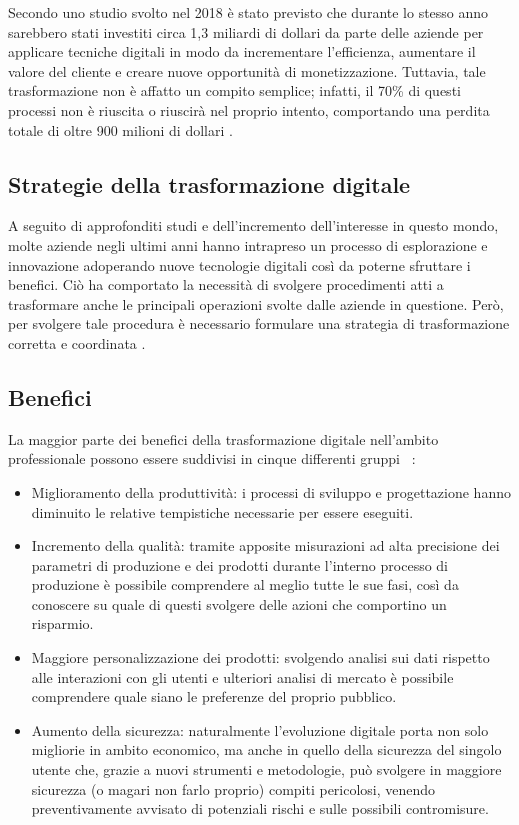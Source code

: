 Secondo uno studio svolto nel 2018 è stato previsto che durante lo stesso anno sarebbero stati investiti circa 1,3 miliardi di dollari da parte delle aziende per applicare tecniche digitali in modo da incrementare l'efficienza, aumentare il valore del cliente e creare nuove opportunità di monetizzazione. Tuttavia, tale trasformazione non è affatto un compito semplice; infatti, il 70\% di questi processi non è riuscita o riuscirà nel proprio intento, comportando  una perdita totale di oltre 900 milioni di dollari \cite{forbes_digital_transformation_fail}.

\subsection{Strategie della trasformazione digitale}

A seguito di approfonditi studi e dell'incremento dell'interesse in questo mondo, molte aziende negli ultimi anni hanno intrapreso un processo di esplorazione e innovazione adoperando nuove tecnologie digitali così da poterne sfruttare i benefici. Ciò ha comportato la necessità di svolgere procedimenti atti a trasformare anche le principali operazioni svolte dalle aziende in questione. Però, per svolgere tale procedura è necessario formulare una strategia di trasformazione corretta e coordinata \cite{digital_transformation_strategies}.

\subsection{Benefici}

La maggior parte dei benefici della trasformazione digitale nell'ambito professionale possono essere suddivisi in cinque differenti gruppi ~\cite{sciencedirect_digital_transformation_benefits}:
\begin{itemize}
    \item Miglioramento della produttività: i processi di sviluppo e progettazione hanno diminuito le relative tempistiche necessarie per essere eseguiti.
    \item Incremento della qualità: tramite apposite misurazioni ad alta precisione dei parametri di produzione e dei prodotti durante l'interno processo di produzione è possibile comprendere al meglio tutte le sue fasi, così da conoscere su quale di questi svolgere delle azioni che comportino un risparmio.
    \item Maggiore personalizzazione dei prodotti: svolgendo analisi sui dati rispetto alle interazioni con gli utenti e ulteriori analisi di mercato è possibile comprendere quale siano le preferenze del proprio pubblico.
    \item Aumento della sicurezza: naturalmente l’evoluzione digitale porta non solo migliorie in ambito economico, ma anche in quello della sicurezza del singolo utente che, grazie a nuovi strumenti e metodologie, può svolgere in maggiore sicurezza (o magari non farlo proprio) compiti pericolosi, venendo preventivamente avvisato di potenziali rischi e sulle possibili contromisure.
\end{itemize}

